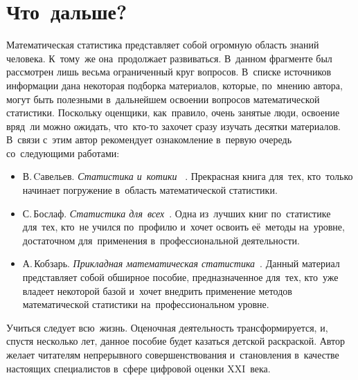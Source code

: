 \documentclass[]{scrartcl}
\begin{document}
\section{Что~дальше?}
Математическая статистика представляет собой огромную область знаний человека. К~тому~же она~продолжает развиваться. В~данном фрагменте был рассмотрен лишь весьма ограниченный круг вопросов. В~списке источников информации дана некоторая подборка материалов, которые, по~мнению автора, могут быть полезными в~дальнейшем освоении вопросов математической статистики. Поскольку оценщики, как~правило, очень занятые люди, освоение вряд~ли можно ожидать, что~кто-то захочет сразу изучать десятки материалов. В~связи с~этим автор рекомендует ознакомление в~первую очередь со~следующими работами:
	\begin{itemize}
		\item В.\,Cавельев. \emph{Статистика и~котики} ~\cite{Statistika-i-kotiki}. Прекрасная книга для~тех, кто~только начинает погружение в~область математической статистики.
		\item С.\,Бослаф. \emph{Статистика для~всех}~\cite{Statistika-dlya-vsex}. Одна из~лучших книг по~статистике для~тех, кто~не учился по~профилю и~хочет освоить её~методы на~уровне, достаточном для~применения в~профессиональной деятельности.
		\item А.\,Кобзарь. \emph{Прикладная математическая статистика}~\cite{Kobzarq-prikl-mathstat}. Данный материал представляет собой обширное пособие, предназначенное для~тех, кто~уже владеет некоторой базой и~хочет внедрить применение методов математической статистики на~профессиональном уровне.     
	\end{itemize}  

Учиться следует всю~жизнь. Оценочная деятельность трансформируется, и, спустя несколько лет, данное пособие будет казаться детской раскраской. Автор желает читателям непрерывного совершенствования и~становления в~качестве настоящих специалистов в~сфере цифровой оценки XXI~века.

\nocite{Statistika-i-kotiki, Xalqman:Regression-analiz, Baraz:KRA, GOST:Tochnostq-izmerenij-1, GOST:Statmetody, GOST:Statterminy, Stepik:osnovy-statistiki-1, Stepik:osnovy-statistiki-2, Stepik:osnovy-statistiki-3, Teorver-v-uduvolqstvie, CSC:la, CSC:teoriya-grafov, CSC:mathstat-1, CSC:diskt-math, CSC:matan-1, CSC:matan-2, CSC:teorver, CSC:vvedenie-v-matan, Statostika-dlya-gum, Stat-radiosignal, Sprav:mathstat, Math-mod-Kazanczeva, Statistika-dlya-vsex, Veroyatnosty-i-mathstat-Encz, Kobzarq-prikl-mathstat, N-hist, Stat-vyvody-i-svyazi, ITMO:statistika, Drejper-Smith:prikl-regr-analiz, Ajwazyan-prikl-stat, Shixalyyow-Regr-an-par-regr, Biznes-analiz-informaczii:statmetody}
\printbibliography[title=Источники информации]
\end{document}
